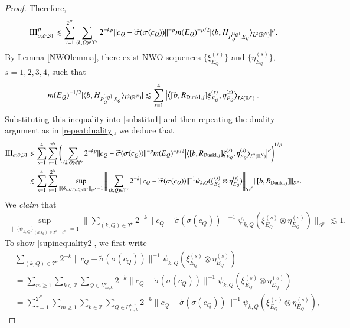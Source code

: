 \documentclass[12pt]{amsart}
\begin{document}
\begin{proof}
Therefore,
\begin{align}\label{substitu1}
  {\rm III}_{\sigma,\tilde{\sigma},31}^p\lesssim \sum_{\nu=1}^{2^N}\sum_{(k,Q)\in \Upsilon^\nu}2^{-kp}\|c_Q-\widetilde{\sigma}(\sigma(c_Q))\|^{-p}m(E_Q)^{-p/2}|\langle b,H_{P_Q^{[s_Q]},E_Q}\rangle_{L^2(\mathbb{R}^N)}|^{p}.
\end{align}
By Lemma \ref{NWOlemma}, there exist NWO sequences $\{\xi_{E_Q}^{(s)}\}$ and $\{\eta_{E_Q}^{(s)}\}$, $s=1,2,3,4$, such that
\begin{align*}
m(E_Q)^{-1/2}|\langle b,H_{P_Q^{[s_Q]},E_Q}\rangle_{L^2(\mathbb{R}^N)}|\lesssim \sum_{s=1}^4\big|\big\langle [b,R_{{\rm Dunkl},j}]\xi_{E_Q}^{(s)},\eta_{E_Q}^{(s)}\big\rangle_{L^2(\mathbb{R}^N)}\big|.
\end{align*}
Substituting this inequality into \eqref{substitu1} and then repeating the duality argument as in \eqref{repeatduality}, we deduce that
\begin{align}\label{beclaimm}
{\rm III}_{\sigma,\tilde{\sigma},31}
&\lesssim \sum_{s=1}^4\sum_{\nu=1}^{2^N}\Bigg(\sum_{(k,Q)\in \Upsilon^\nu}2^{-kp}\|c_Q-\widetilde{\sigma}(\sigma(c_Q))\|^{-p}m(E_Q)^{-p/2}\big|\big\langle [b,R_{{\rm Dunkl},j}]\xi_{E_Q}^{(s)},\eta_{E_Q}^{(s)}\big\rangle_{L^2(\mathbb{R}^N)}\big|^{p}\Bigg)^{1/p}\nonumber\\
&\lesssim\sum_{s=1}^4\sum_{\nu=1}^{2^N}\sup_{\|\{\psi_{k,Q}\}_{(k,Q)\in\Upsilon^\nu}\|_{\ell^{p'}}=1}\Bigg\|\sum_{(k,Q)\in\Upsilon^\nu}2^{-k}\|c_Q-\widetilde{\sigma}(\sigma(c_Q))\|^{-1}\psi_{k,Q}(\xi_{E_Q}^{(s)}\otimes \eta_{E_Q}^{(s)})\Bigg\|_{S^{p'}}\|[b,R_{{\rm Dunkl},j}]\|_{S^p}.
\end{align}
We {\it claim} that
\begin{align}\label{supinequality2}
\sup_{\|\{\psi_{k,Q}\}_{(k,Q)\in\Upsilon^\nu}\|_{\ell^{p'}}=1}\Bigg\|\sum_{(k,Q)\in\Upsilon^\nu}2^{-k}\|c_Q-\widetilde{\sigma}(\sigma(c_Q))\|^{-1}\psi_{k,Q}(\xi_{E_Q}^{(s)}\otimes \eta_{E_Q}^{(s)})\Bigg\|_{S^{p'}}\lesssim 1.
\end{align}
To show \eqref{supinequality2}, we first write
\begin{align}\label{rhs7777}
&\sum_{(k,Q)\in\Upsilon^\nu}2^{-k}\|c_Q-\widetilde{\sigma}(\sigma(c_Q))\|^{-1}\psi_{k,Q}(\xi_{E_Q}^{(s)}\otimes \eta_{E_Q}^{(s)})\nonumber\\
&=\sum_{m\geq 1}\sum_{k\in\mathbb{Z}}\sum_{Q\in U_{m,k}^\nu}2^{-k}\|c_Q-\widetilde{\sigma}(\sigma(c_Q))\|^{-1}\psi_{k,Q} (\xi_{E_Q}^{(s)}\otimes \eta_{E_Q}^{(s)})\nonumber\\
&=\sum_{\tau=1}^{2^N}\sum_{m\geq 1}\sum_{k\in\mathbb{Z}}\sum_{Q\in U_{m,k}^{\nu,\tau}}2^{-k}\|c_Q-\widetilde{\sigma}(\sigma(c_Q))\|^{-1}\psi_{k,Q} (\xi_{E_Q}^{(s)}\otimes \eta_{E_Q}^{(s)}),

\end{align}
\end{proof}
\end{document}
